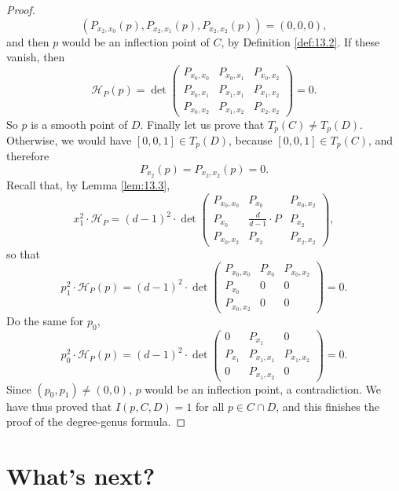 \documentclass{article}
\renewcommand{\H}{\mathcal{H}}
\newcommand{\rb}[1]{\left( #1 \right)}
\renewcommand{\sb}[1]{\left[ #1 \right]}
\theoremstyle{definition}\newtheorem{definition}{Definition}[section]
\theoremstyle{definition}\newtheorem{notation}[definition]{Notation}
\theoremstyle{definition}\newtheorem{remark}[definition]{Remark}
\theoremstyle{definition}\newtheorem{example1}[definition]{Example}
\theoremstyle{definition}\newtheorem{fact}{Fact}
\theoremstyle{definition}\newtheorem{exercise}{Exercise}
\theoremstyle{definition}\newtheorem*{example2}{Example}
\begin{document}
\begin{proof}
$$ \rb{P_{x_2, x_0}\rb{p}, P_{x_2, x_1}\rb{p}, P_{x_2, x_2}\rb{p}} = \rb{0, 0, 0}, $$
and then $ p $ would be an inflection point of $ C $, by Definition \ref{def:13.2}. If these vanish, then
$$ \H_P\rb{p} = \det\begin{pmatrix}
P_{x_0, x_0} & P_{x_0, x_1} & P_{x_0, x_2} \\
P_{x_0, x_1} & P_{x_1, x_1} & P_{x_1, x_2} \\
P_{x_0, x_2} & P_{x_1, x_2} & P_{x_2, x_2}
\end{pmatrix} = 0. $$
So $ p $ is a smooth point of $ D $. Finally let us prove that $ T_p\rb{C} \ne T_p\rb{D} $. Otherwise, we would have $ \sb{0, 0, 1} \in T_p\rb{D} $, because $ \sb{0, 0, 1} \in T_p\rb{C} $, and therefore
$$ P_{x_2}\rb{p} = P_{x_2, x_2}\rb{p} = 0. $$
Recall that, by Lemma \ref{lem:13.3},
$$ x_1^2 \cdot \H_P = \rb{d - 1}^2 \cdot \det \begin{pmatrix}
P_{x_0, x_0} & P_{x_0} & P_{x_0, x_2} \\
P_{x_0} & \tfrac{d}{d - 1} \cdot P & P_{x_2} \\
P_{x_0, x_2} & P_{x_2} & P_{x_2, x_2}
\end{pmatrix}, $$
so that
$$ p_1^2 \cdot \H_P\rb{p} = \rb{d - 1}^2 \cdot \det\begin{pmatrix}
P_{x_0, x_0} & P_{x_0} & P_{x_0, x_2} \\
P_{x_0} & 0 & 0 \\
P_{x_0, x_2} & 0 & 0
\end{pmatrix} = 0. $$
Do the same for $ p_0 $,
$$ p_0^2 \cdot \H_P\rb{p} = \rb{d - 1}^2 \cdot \det\begin{pmatrix}
0 & P_{x_1} & 0 \\
P_{x_1} & P_{x_1, x_1} & P_{x_1, x_2} \\
0 & P_{x_1, x_2} & 0
\end{pmatrix} = 0. $$
Since $ \rb{p_0, p_1} \ne \rb{0, 0} $, $ p $ would be an inflection point, a contradiction. We have thus proved that $ I\rb{p, C, D} = 1 $ for all $ p \in C \cap D $, and this finishes the proof of the degree-genus formula.
\end{proof}

\pagebreak

\section{What's next?}
\end{document}
